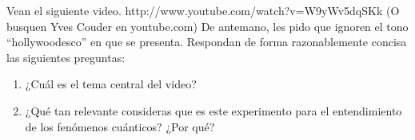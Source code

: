 \documentclass[10pt,letterpaper]{article}
\newenvironment{modenumerate}
  {\enumerate\setupmodenumerate}
  {\endenumerate}
\newif\ifmoditem
\newcommand{\setupmodenumerate}{%
  \global\moditemfalse
  \let\origmakelabel\makelabel
  \def\moditem##1{\global\moditemtrue\def\mesymbol{##1}\item}%
  \def\makelabel##1{%
    \origmakelabel{##1\ifmoditem\rlap{\mesymbol}\fi\enspace}%
    \global\moditemfalse}%
}
\begin{document}
\begin{modenumerate}
\item Vean el siguiente video. http://www.youtube.com/watch?v=W9yWv5dqSKk (O busquen Yves Couder en youtube.com) De antemano, les pido que ignoren el tono ``hollywoodesco'' en que se presenta. Respondan de forma razonablemente concisa las siguientes preguntas:

\begin{enumerate}
\renewcommand{\theenumi}{\Alph{enumi}}
\item ¿Cuál es el tema central del video?
\item ¿Qué tan relevante consideras que es este experimento para el entendimiento de los fenómenos cuánticos? ¿Por qué?
\end{enumerate}







\end{modenumerate}
\end{document}
